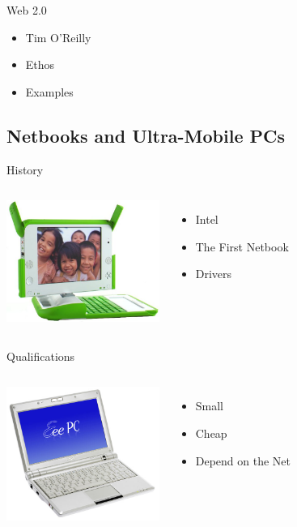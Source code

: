 \documentclass{beamer}
\begin{document}
\begin{frame}{Web 2.0}
  \begin{itemize}
  \item Tim O'Reilly
  \item Ethos
  \item Examples
  \end{itemize}
\end{frame}

\subsection{Netbooks and Ultra-Mobile PCs}

\begin{frame}{History}
  \begin{columns}
    \column{5cm}
      \includegraphics[width=5cm]{olpc.jpg}
    \column{5cm}
      \begin{itemize}
      \item Intel %
      \item The First Netbook
      \item Drivers
      \end{itemize}
  \end{columns}
\end{frame}

\begin{frame}{Qualifications}
  \begin{columns}
    \column{5cm}
      \includegraphics[width=5cm]{netbookSpecs.jpg}
    \column{5cm}
      \begin{itemize}
      \item Small
      \item Cheap
      \item Depend on the Net
      \end{itemize}
  \end{columns}
\end{frame}
\end{document}
